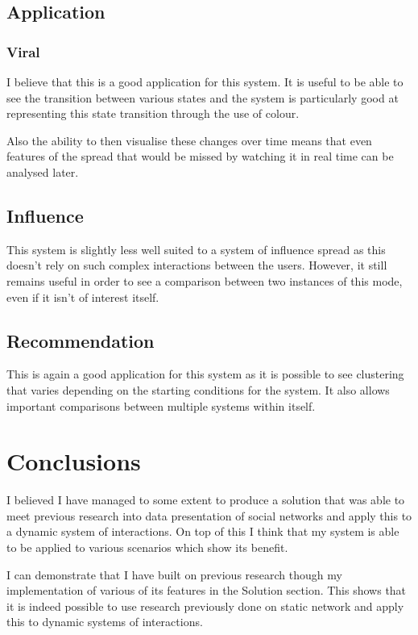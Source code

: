 \documentclass[12pt,a4paper]{article}
\begin{document}
\subsection{Application}

\subsubsection{Viral}

I believe that this is a good application for this system. It is useful to be able to see the transition between various states and the system is particularly good at representing this state transition through the use of colour.

Also the ability to then visualise these changes over time means that even features of the spread that would be missed by watching it in real time can be analysed later.

\subsection{Influence}

This system is slightly less well suited to a system of influence spread as this doesn't rely on such complex interactions between the users. However, it still remains useful in order to see a comparison between two instances of this mode, even if it isn't of interest itself.

\subsection{Recommendation}

This is again a good application for this system as it is possible to see clustering that varies depending on the starting conditions for the system. It also allows important comparisons between multiple systems within itself.

\section{Conclusions}

I believed I have managed to some extent to produce a solution that was able to meet previous research into data presentation of social networks and apply this to a dynamic system of interactions. On top of this I think that my system is able to be applied to various scenarios which show its benefit.

I can demonstrate that I have built on previous research though my implementation of various of its features in the Solution section. This shows that it is indeed possible to use research previously done on static network and apply this to dynamic systems of interactions.
\end{document}
